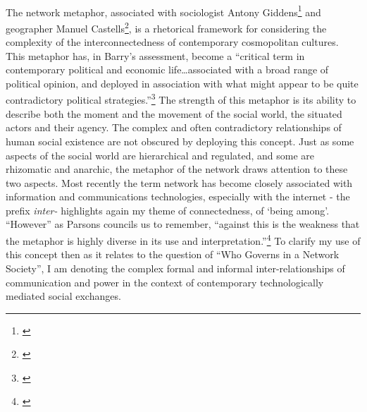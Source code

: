 \documentclass[11pt,titlepage]{book}
\begin{document}
\paragraph{}The network metaphor, associated with sociologist Antony Giddens\footnote{\cite{Giddens:1990cm}} and geographer Manuel Castells\footnote{\cite{Castells:1996ns}}, is a rhetorical framework for considering the complexity of the interconnectedness of contemporary cosmopolitan cultures. This metaphor has, in Barry's assessment, become a ``critical term in contemporary political and economic life\ldots associated with a broad range of political opinion, and deployed in association with what might appear to be quite contradictory political strategies.''\footnote{\cite[p.85]{Barry:2001ff}} The strength of this metaphor is its ability to describe both the moment and the movement of the social world, the situated actors and their agency. The complex and often contradictory relationships of human social existence are not obscured by deploying this concept. Just as some aspects of the social world are hierarchical and regulated, and some are rhizomatic and anarchic, the metaphor of the network draws attention to these two aspects. Most recently the term network has become closely associated with information and communications technologies, especially with the internet - the prefix \textit{inter-} highlights again my theme of connectedness, of `being among'.  ``However'' as Parsons councils us to remember, ``against this is the weakness that the metaphor is highly diverse in its use and interpretation.''\footnote{\cite[p.185]{parsons:1995}} To clarify my use of this concept then as it relates to the question of ``Who Governs in a Network Society'', I am denoting the complex formal and informal inter-relationships of communication and power in the context of contemporary technologically mediated social exchanges.
\end{document}
